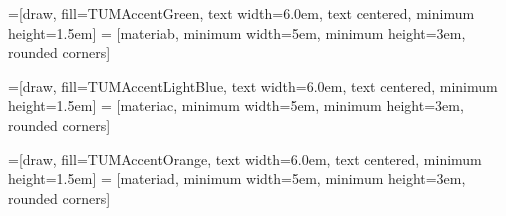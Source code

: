 =[draw, fill=TUMAccentGreen, text width=6.0em, text centered,
minimum height=1.5em]
 = [materiab, minimum width=5em,
minimum height=3em, rounded corners]
\newcommand{\defnodeb}[2]{node (p#1) [practicab]
	{{\scriptsize\textit{#2}}}}

=[draw, fill=TUMAccentLightBlue, text width=6.0em, text centered,
minimum height=1.5em]
 = [materiac, minimum width=5em,
minimum height=3em, rounded corners]
\newcommand{\defnodec}[2]{node (p#1) [practicac]
	{{\scriptsize\textit{#2}}}}

=[draw, fill=TUMAccentOrange, text width=6.0em, text centered,
minimum height=1.5em]
 = [materiad, minimum width=5em,
minimum height=3em, rounded corners]
\newcommand{\defnoded}[2]{node (p#1) [practicad]
	{{\scriptsize\textit{#2}}}}

\newcommand{\background}[5]{%
	\begin{pgfonlayer}{background}
		\path (#1.west |- #2.north)+(-0.5,0.5) node (a1) {};
		\path (#3.east |- #4.south)+(+0.5,-0.25) node (a2) {};
		\path[fill=white,rounded corners, draw=black!50, dashed]
		(a1) rectangle (a2);
		\path (a1.east |- a1.south)+(0.8,0.2) node (u1)[texto]
		{\normalsize\textit{#5}};
\end{pgfonlayer}}

\newcommand{\legend}[5]{%
	\begin{pgfonlayer}{legend}
		\path (#1.west |- #2.north)+(-0.5,0.5) node (a1) {};
		\path (#3.east |- #4.south)+(+0.5,-0.25) node (a2) {};
		\path[fill=white, draw=black!50]
		(a1) rectangle (a2);
		\path (a1.east |- a1.south)+(0.8,0.2) node (u1)[texto]
		{\normalsize\textit{#5}};
\end{pgfonlayer}}



